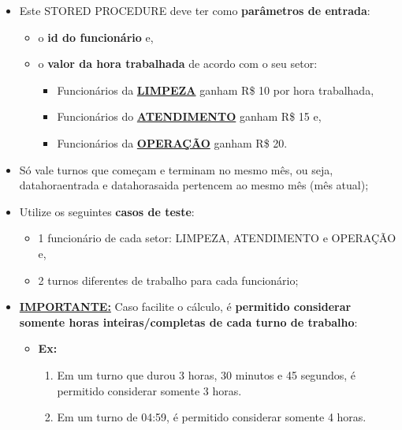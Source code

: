 \documentclass[12pt]{exam}
\begin{document}
\begin{questions}
\begin{itemize}
    \item Este STORED PROCEDURE deve ter como \textbf{parâmetros de entrada}: 
    \begin{itemize}
        \item o \textbf{id do funcionário} e,
        \item o \textbf{valor da hora trabalhada} de acordo com o seu setor:
        \begin{itemize}
\item Funcionários da \underline{\textbf{LIMPEZA}} ganham R\$ 10 por hora trabalhada,
\item Funcionários do \underline{\textbf{ATENDIMENTO}} ganham R\$ 15 e,
\item Funcionários da \underline{\textbf{OPERAÇÃO}} ganham R\$ 20.
\end{itemize}
    \end{itemize}
    \item Só vale turnos que começam e terminam no mesmo mês, ou seja, data\underline{\hspace{0.2cm}}hora\underline{\hspace{0.2cm}}entrada e data\underline{\hspace{0.2cm}}hora\underline{\hspace{0.2cm}}saida pertencem ao mesmo mês (mês atual);
\item Utilize os seguintes \textbf{casos de teste}: 
\begin{itemize}
    \item 1 funcionário de cada setor: LIMPEZA, ATENDIMENTO e OPERAÇÃO e,
    \item 2 turnos diferentes de trabalho para cada funcionário;
\end{itemize} 
\item \textbf{\underline{IMPORTANTE:}} Caso facilite o cálculo, é \textbf{permitido considerar somente horas inteiras/completas de cada turno de trabalho}: 
\begin{itemize}
    \item \textbf{Ex:} 
    \begin{enumerate}
        \item Em um turno que durou 3 horas, 30 minutos e 45 segundos, é permitido considerar somente 3 horas.
        \item Em um turno de 04:59, é permitido considerar somente 4 horas.
    \end{enumerate}
\end{itemize}
\end{itemize}


\end{questions}
\end{document}
